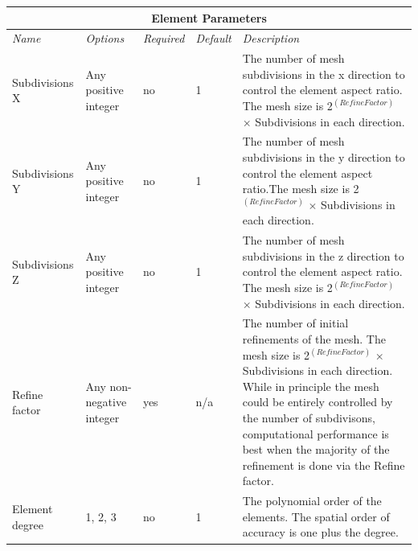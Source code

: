 \documentclass[10pt]{article} %
\begin{document}
\begin{center}
    \begin{tabular}{ | p{} | p{} | p{} | p{} | p{} |}
    \hline
      \multicolumn{5}{|c|}{\textbf{Element Parameters}} \\
    \hline
    \hline
    \emph{Name} & \emph{Options} & \emph{Required} & \emph{Default} & \emph{Description} \\ \hline
    Subdivisions X & Any positive integer & no & 1 & The number of mesh subdivisions in the x direction to control the element aspect ratio. The mesh size is 2$^{(Refine Factor)}$ $\times$ Subdivisions in each direction.\\ \hline
     Subdivisions Y & Any positive integer & no & 1 & The number of mesh subdivisions in the y direction to control the element aspect ratio.The mesh size is 2$^{(Refine Factor)}$ $\times$ Subdivisions in each direction. \\ \hline
      Subdivisions Z & Any positive integer & no & 1 & The number of mesh subdivisions in the z direction to control the element aspect ratio. The mesh size is 2$^{(Refine Factor)}$ $\times$ Subdivisions in each direction.\\ \hline
      Refine factor & Any non-negative integer & yes & n/a & The number of initial refinements of the mesh. The mesh size is 2$^{(Refine Factor)}$ $\times$ Subdivisions in each direction. While in principle the mesh could be entirely controlled by the number of subdivisons, computational performance is best when the majority of the refinement is done via the Refine factor. \\ \hline
       Element degree & 1, 2, 3 & no & 1 & The polynomial order of the elements. The spatial order of accuracy is one plus the degree. \\ \hline
    \end{tabular}
\end{center}
\end{document}

